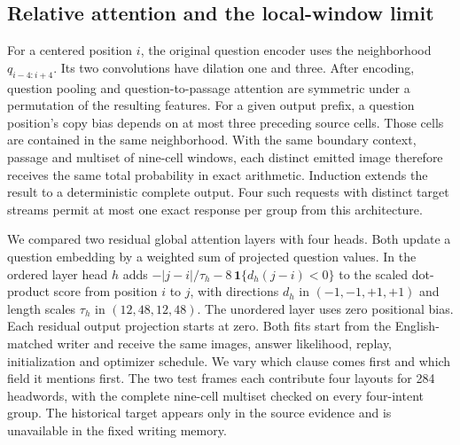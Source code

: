 \documentclass[12pt,a4paper]{article}
\providecommand{\DIFadd}[1]{{\protect\color{blue} \sf #1}} %
\begin{document}
\subsection*{\DIFadd{Relative attention and the local-window limit}}
\DIFadd{For a centered position $i$, the original question encoder uses the neighborhood $q_{i-4:i+4}$. Its two convolutions have dilation one and three. After encoding, question pooling and question-to-passage attention are symmetric under a permutation of the resulting features. For a given output prefix, a question position's copy bias depends on at most three preceding source cells. Those cells are contained in the same neighborhood. With the same boundary context, passage and multiset of nine-cell windows, each distinct emitted image therefore receives the same total probability in exact arithmetic. Induction extends the result to a deterministic complete output. Four such requests with distinct target streams permit at most one exact response per group from this architecture.
}

\DIFadd{We compared two residual global attention layers with four heads. Both update a question embedding by a weighted sum of projected question values. In the ordered layer head $h$ adds $-|j-i|/\tau_h-8\,\mathbf{1}\{d_h(j-i)<0\}$ to the scaled dot-product score from position $i$ to $j$, with directions $d_h$ in $(-1,-1,+1,+1)$ and length scales $\tau_h$ in $(12,48,12,48)$. The unordered layer uses zero positional bias. Each residual output projection starts at zero. Both fits start from the English-matched writer and receive the same images, answer likelihood, replay, initialization and optimizer schedule. We vary which clause comes first and which field it mentions first. The two test frames each contribute four layouts for 284 headwords, with the complete nine-cell multiset checked on every four-intent group. The historical target appears only in the source evidence and is unavailable in the fixed writing memory.
}
\end{document}
